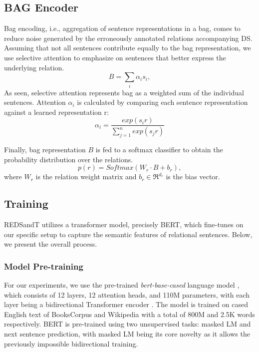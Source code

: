 \documentclass[11pt,a4paper]{article}
\begin{document}
\subsection{BAG Encoder}
Bag encoding, i.e., aggregation of sentence representations in a bag, comes to reduce noise generated by the erroneously annotated relations accompanying DS.
Assuming that not all sentences contribute equally to the bag representation, we use selective attention \cite{Lin2016} to emphasize on sentences that better express the underlying relation.
\begin{equation}
    B = \sum_i \alpha_i s_i,
\end{equation}
As seen, selective attention represents bag as a weighted sum of the individual sentences. Attention $\alpha_i$ is calculated by comparing each sentence representation against a learned representation r:
\begin{equation}
    \alpha_i=\frac{exp(s_i r)}{\sum_{j=1}^{n} exp(s_j r)}
\end{equation}

Finally, bag representation $B$ is fed to a softmax classifier to obtain the probability distribution over the relations.
\begin{equation}
    p(r) = Softmax(W_r \cdot B + b_r), 
\end{equation}
where $W_r$ is the relation weight matrix and $b_r \in \Re^{d_r}$ is the bias vector. 

\subsection{Training}
REDSandT utilizes a transformer model, precisely BERT, which fine-tunes on our specific setup to capture the semantic features of relational sentences. Below, we present the overall process.

\subsubsection{Model Pre-training}
For our experiments, we use the pre-trained \textit{bert-base-cased} language model \cite{Devlin}, which consists of 12 layers, 12 attention heads, and 110M parameters, with each layer being a bidirectional Transformer encoder \cite{Vaswani2017}. The model is trained on cased English text of BooksCorpus and Wikipedia with a total of 800M and 2.5K words respectively. BERT is pre-trained using two unsupervised tasks: masked LM and next sentence prediction, with masked LM being its core novelty as it allows the previously impossible bidirectional training.
\end{document}
